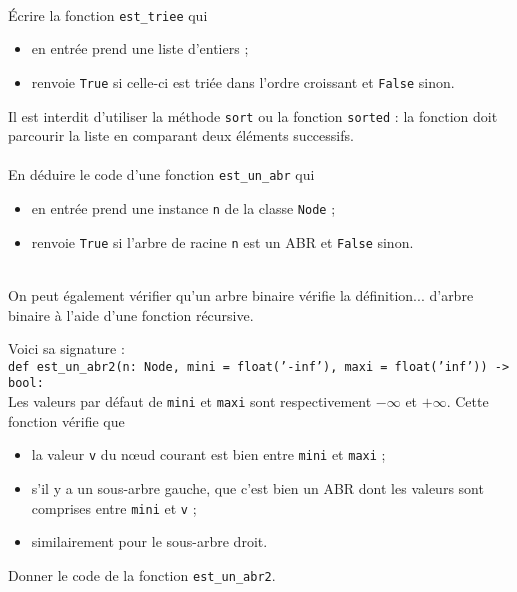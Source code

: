 \documentclass[a4paper,12pt,eval,firamath]{nsi}
\begin{document}
\\


\question Écrire la fonction \texttt{est_triee} qui
\begin{itemize}
    \item en entrée prend une liste d'entiers ;
    \item renvoie \texttt{True} si celle-ci est triée dans l'ordre croissant et \texttt{False} sinon.
\end{itemize} 
Il est interdit d'utiliser la méthode \texttt{sort} ou la fonction \texttt{sorted} : la fonction doit parcourir la liste en comparant deux éléments successifs.\\

\\

\question En déduire le code d'une fonction \texttt{est_un_abr} qui
\begin{itemize}
    \item en entrée prend une instance \texttt{n}   de la classe \texttt{Node} ;
    \item renvoie \texttt{True} si l'arbre de racine \texttt{n}  est un ABR et \texttt{False} sinon.
\end{itemize} 

\\


On peut également vérifier qu'un arbre binaire vérifie la définition... d'arbre binaire à l'aide d'une fonction récursive.

Voici sa signature :\\

\texttt{def est_un_abr2(n: Node, mini = float('-inf'), maxi = float('inf')) -> bool:} \\

Les valeurs par défaut de \texttt{mini} et \texttt{maxi} sont respectivement $-\infty$ et $+\infty$.
Cette fonction vérifie que 
\begin{itemize}
    \item la valeur \texttt{v} du n\oe ud courant est bien entre \texttt{mini} et \texttt{maxi} ;
    \item s'il y a un sous-arbre gauche, que c'est bien un ABR dont les valeurs sont comprises entre \texttt{mini} et \texttt{v} ;
    \item similairement pour le sous-arbre droit.
\end{itemize}

\question Donner le code de la fonction \texttt{est_un_abr2}.\\

\end{document}
